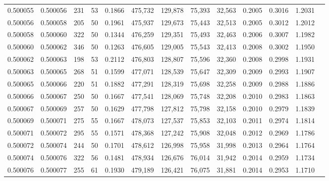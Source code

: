 \begin{tabular}{rrrrrrrrrrrrr}
0.500055 & 0.500056 & 231 &  53 &                                     0.1866 & 475,732 & 129,878 &  75,393 &  32,563 & 0.2005 & 0.3016 & 1.2031 \\
0.500056 & 0.500058 & 205 &  50 &                                     0.1961 & 475,937 & 129,673 &  75,443 &  32,513 & 0.2005 & 0.3012 & 1.2012 \\
0.500058 & 0.500060 & 322 &  50 &                                     0.1344 & 476,259 & 129,351 &  75,493 &  32,463 & 0.2006 & 0.3007 & 1.1982 \\
0.500060 & 0.500062 & 346 &  50 &                                     0.1263 & 476,605 & 129,005 &  75,543 &  32,413 & 0.2008 & 0.3002 & 1.1950 \\
0.500062 & 0.500063 & 198 &  53 &                                     0.2112 & 476,803 & 128,807 &  75,596 &  32,360 & 0.2008 & 0.2998 & 1.1931 \\
0.500063 & 0.500065 & 268 &  51 &                                     0.1599 & 477,071 & 128,539 &  75,647 &  32,309 & 0.2009 & 0.2993 & 1.1907 \\
0.500065 & 0.500066 & 220 &  51 &                                     0.1882 & 477,291 & 128,319 &  75,698 &  32,258 & 0.2009 & 0.2988 & 1.1886 \\
0.500066 & 0.500067 & 250 &  50 &                                     0.1667 & 477,541 & 128,069 &  75,748 &  32,208 & 0.2010 & 0.2983 & 1.1863 \\
0.500067 & 0.500069 & 257 &  50 &                                     0.1629 & 477,798 & 127,812 &  75,798 &  32,158 & 0.2010 & 0.2979 & 1.1839 \\
0.500069 & 0.500071 & 275 &  55 &                                     0.1667 & 478,073 & 127,537 &  75,853 &  32,103 & 0.2011 & 0.2974 & 1.1814 \\
0.500071 & 0.500072 & 295 &  55 &                                     0.1571 & 478,368 & 127,242 &  75,908 &  32,048 & 0.2012 & 0.2969 & 1.1786 \\
0.500072 & 0.500074 & 244 &  50 &                                     0.1701 & 478,612 & 126,998 &  75,958 &  31,998 & 0.2013 & 0.2964 & 1.1764 \\
0.500074 & 0.500076 & 322 &  56 &                                     0.1481 & 478,934 & 126,676 &  76,014 &  31,942 & 0.2014 & 0.2959 & 1.1734 \\
0.500076 & 0.500077 & 255 &  61 &                                     0.1930 & 479,189 & 126,421 &  76,075 &  31,881 & 0.2014 & 0.2953 & 1.1710 \\

\end{tabular}

